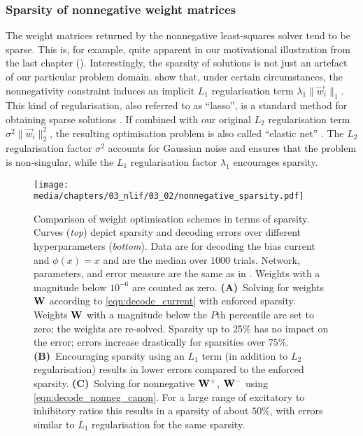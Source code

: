\pagebreak

\subsubsection{Sparsity of nonnegative weight matrices}
The weight matrices returned by the nonnegative least-squares solver tend to be sparse.
This is, for example, quite apparent in our motivational illustration from the last chapter ().
Interestingly, the sparsity of \NNLS solutions is not just an artefact of our particular problem domain.
 show that, under certain circumstances, the nonnegativity constraint induces an implicit $L_1$ regularisation term $\lambda_1 \|\vec w_i\|_1$.
This kind of regularisation, also referred to as \enquote{lasso}, is a standard method for obtaining sparse solutions \citep[Section~3.1.4]{bishop2006pattern}.
If combined with our original $L_2$ regularisation term $\sigma^2 \| \vec w_i \|_2^2$, the resulting optimisation problem is also called \enquote{elastic net} \citep{zou2005regularization}.
The $L_2$ regularisation factor $\sigma^2$ accounts for Gaussian noise and ensures that the problem is non-singular, while the $L_1$ regularisation factor $\lambda_1$ encourages sparsity.

\begin{figure}
	\texttt{[image: media/chapters/03\_nlif/03\_02/nonnegative\_sparsity.pdf]}%
	{\label{fig:nonnegative_sparsity_a}}%
	{\label{fig:nonnegative_sparsity_b}}%
	{\label{fig:nonnegative_sparsity_c}}%
	\caption[Comparison of weight optimisation schemes in terms of sparsity]{Comparison of weight optimisation schemes in terms of sparsity.
	Curves (\emph{top}) depict sparsity and decoding errors over different hyperparameters (\emph{bottom}).
	Data are for decoding the bias current and $\phi(x) = x$ and are the median over $1000$ trials.
	Network, parameters, and error measure are the same as in .
	Weights with a magnitude below $10^{-6}$ are counted as zero.
	\textbf{(A)}~Solving for weights $\mathbf{W}$ according to \cref{eqn:decode_current} with enforced sparsity.
	Weights $\mathbf{W}$ with a magnitude below the $P$th percentile are set to zero; the weights are re-solved.
	Sparsity up to $25\%$ has no impact on the error; errors increase drastically for sparsities over $75\%$.
	\textbf{(B)}~Encouraging sparsity using an $L_1$ term (in addition to $L_2$ regularisation) results in lower errors compared to the enforced sparsity.
	\textbf{(C)}~Solving for nonnegative $\mathbf{W}^+$, $\mathbf{W}^-$ using \cref{eqn:decode_nonneg_canon}.
	For a large range of excitatory to inhibitory ratios this results in a sparsity of about $50\%$, with errors similar to $L_1$ regularisation for the same sparsity.
	}
	\label{fig:nonnegative_sparsity}
\end{figure}

